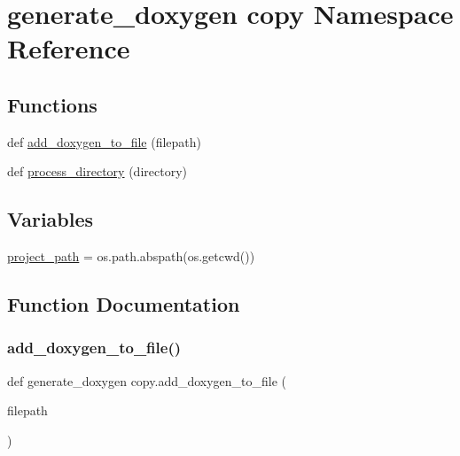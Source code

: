 \hypertarget{namespacegenerate__doxygen_01copy}{}\section{generate\+\_\+doxygen copy Namespace Reference}
\label{namespacegenerate__doxygen_01copy}
\subsection*{Functions}
\begin{DoxyCompactItemize}
\item 
def \hyperlink{namespacegenerate__doxygen_01copy_a32c9778b83b5ff8f91924852cd1b7184}{add\+\_\+doxygen\+\_\+to\+\_\+file} (filepath)
\item 
def \hyperlink{namespacegenerate__doxygen_01copy_a64ea6a8881afb87c3158855bb52edb98}{process\+\_\+directory} (directory)
\end{DoxyCompactItemize}
\subsection*{Variables}
\begin{DoxyCompactItemize}
\item 
\hyperlink{namespacegenerate__doxygen_01copy_a9f73f05b8fb6d9519da03ba38d6ace52}{project\+\_\+path} = os.\+path.\+abspath(os.\+getcwd())
\end{DoxyCompactItemize}


\subsection{Function Documentation}
\mbox{\label{namespacegenerate__doxygen_01copy_a32c9778b83b5ff8f91924852cd1b7184}} 
\subsubsection{\texorpdfstring{add\+\_\+doxygen\+\_\+to\+\_\+file()}{add\_doxygen\_to\_file()}}
{\footnotesize\ttfamily def generate\+\_\+doxygen copy.\+add\+\_\+doxygen\+\_\+to\+\_\+file (\begin{DoxyParamCaption}\item[{}]{filepath }\end{DoxyParamCaption})}

